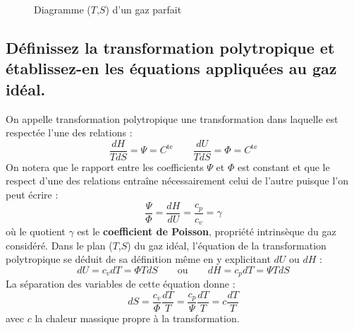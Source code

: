 \begin{figure}[p]\centering
    \caption{Diagramme ($T$,$S$) d'un gaz parfait}
    \label{fig:TS_gaz_parfait}
\end{figure}

\subsection{Définissez la transformation polytropique et établissez-en les équations appliquées au gaz idéal.}
On appelle transformation polytropique une transformation dans laquelle est respectée l'une des relations :
\begin{equation} \frac{dH}{TdS} = \Psi = C^\text{te} \qquad \frac{dU}{TdS} = \Phi = C^\text{te} \end{equation}
On notera que le rapport entre les coefficients $\Psi$ et $\Phi$ est constant et que le respect d'une des relations entraîne nécessairement celui de l'autre puisque l'on peut écrire :
\begin{equation} \frac{\Psi}{\Phi} = \frac{dH}{dU} = \frac{c_p}{c_v} = \gamma \end{equation}
où le quotient $\gamma$ est le \textbf{coefficient de Poisson}, propriété intrinsèque du gaz considéré. Dans le plan ($T$,$S$) du gaz idéal, l'équation de la transformation polytropique se déduit de sa définition même en y explicitant $dU$ ou $dH$ :
\begin{equation} dU = c_vdT = \Phi TdS \qquad \text{ou} \qquad dH = c_pdT = \Psi TdS \end{equation}
La séparation des variables de cette équation donne :
\begin{equation} dS = \frac{c_v}{\Phi}\frac{dT}{T} = \frac{c_p}{\Psi}\frac{dT}{T} = c\frac{dT}{T} \end{equation}
avec $c$ la chaleur massique propre à la transformation.

